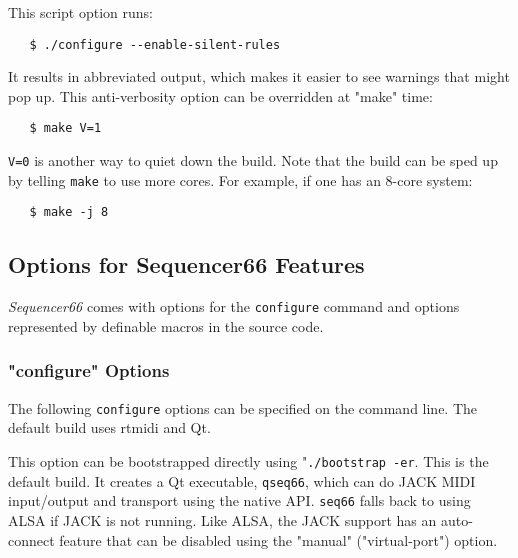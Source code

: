    This script option runs:

\begin{verbatim}
   $ ./configure --enable-silent-rules
\end{verbatim}

   It results in abbreviated output, which makes it easier to see
   warnings that might pop up.
   This anti-verbosity option can be overridden at "make" time:

\begin{verbatim}
   $ make V=1
\end{verbatim}

   \texttt{V=0} is another way to quiet down the build.
   Note that the build can be sped up by telling \texttt{make}
   to use more cores.
   For example, if one has an 8-core system:

\begin{verbatim}
   $ make -j 8
\end{verbatim}


\subsection{Options for Sequencer66 Features}
\label{subsec:seq66_build_options}

   \textsl{Sequencer66} comes with options for the \texttt{configure} command
   and options represented by definable macros in the source code.

\subsubsection{"configure" Options}
\label{subsubsec:seq66_build_configure}

   The following \texttt{configure} options can be specified on the command
   line.  The default build uses rtmidi and Qt.

   \setcounter{ItemCounter}{0}      %

        This option can be bootstrapped directly using
        "\texttt{./bootstrap -er}.
        This is the default build.
        It creates a Qt executable, \texttt{qseq66},
        which can do JACK MIDI input/output and transport using the native API.
        \texttt{seq66} falls back to using ALSA if JACK is not running.  
        Like ALSA, the JACK support has an auto-connect feature
        that can be disabled using the "manual" ("virtual-port")
        option.

